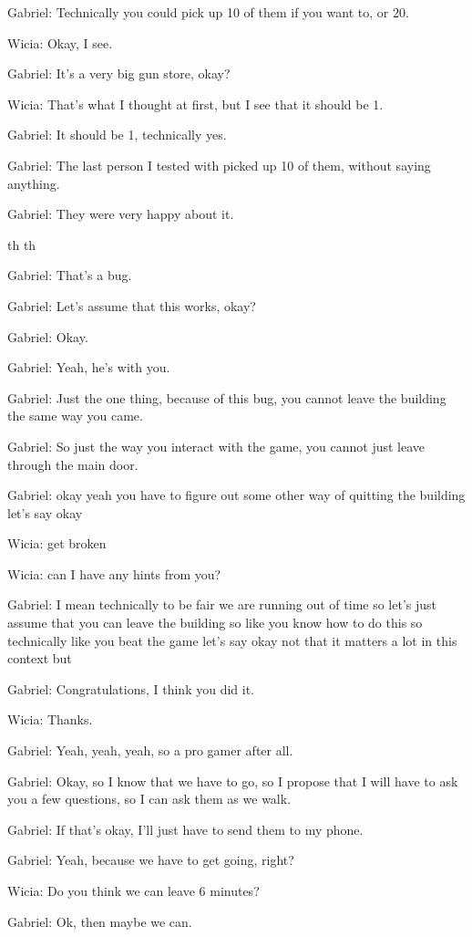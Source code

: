 Gabriel: Technically you could pick up 10 of them if you want to, or 20.

Wicia: Okay, I see.

Gabriel: It's a very big gun store, okay?

Wicia: That's what I thought at first, but I see that it should be 1.

Gabriel: It should be 1, technically yes.

Gabriel: The last person I tested with picked up 10 of them, without saying anything.

Gabriel: They were very happy about it.

th th

Gabriel: That's a bug.

Gabriel: Let's assume that this works, okay?

Gabriel: Okay.

Gabriel: Yeah, he's with you.

Gabriel: Just the one thing, because of this bug, you cannot leave the building the same way you came.

Gabriel: So just the way you interact with the game, you cannot just leave through the main door.

Gabriel: okay yeah you have to figure out some other way of quitting the building let's say okay

Wicia: get broken

Wicia: can I have any hints from you?

Gabriel: I mean technically to be fair we are running out of time so let's just assume that you can leave the building so like you know how to do this so technically like you beat the game let's say okay not that it matters a lot in this context but

Gabriel: Congratulations, I think you did it.

Wicia: Thanks.

Gabriel: Yeah, yeah, yeah, so a pro gamer after all.

Gabriel: Okay, so I know that we have to go, so I propose that I will have to ask you a few questions, so I can ask them as we walk.

Gabriel: If that's okay, I'll just have to send them to my phone.

Gabriel: Yeah, because we have to get going, right?

Wicia: Do you think we can leave 6 minutes?

Gabriel: Ok, then maybe we can.

